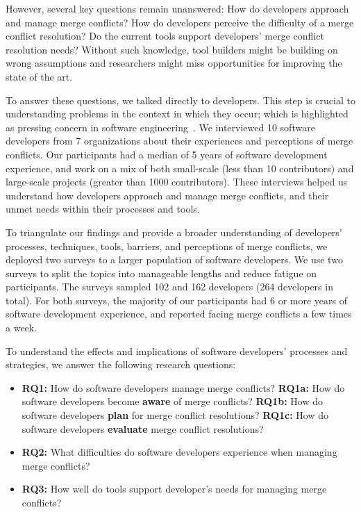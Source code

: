 However, several key questions remain unanswered: 
How do developers approach and manage merge conflicts?
How do developers perceive the difficulty of a merge conflict resolution? 
Do the current tools support developers' merge conflict resolution needs?
Without such knowledge, tool builders might be building on wrong assumptions and researchers might miss opportunities for improving the state of the art.

To answer these questions, we talked directly to developers.
This step is crucial to understanding problems in the context in which they occur; which is highlighted as pressing concern in software engineering~\cite{fritz2010using, sillito2006questions, ko2007information}.
We interviewed 10 software developers from 7 organizations about their experiences and perceptions of merge conflicts. %
Our participants had a median of 5 years of software development experience, and work on a mix of both small-scale (less than 10 contributors) and large-scale projects (greater than 1000 contributors).
These interviews helped us understand how developers approach and manage merge conflicts, and their unmet needs within their processes and tools.

To triangulate our findings and provide a broader understanding of developers' processes, techniques, tools, barriers, and perceptions of merge conflicts, we deployed two surveys to a larger population of software developers.
We use two surveys to split the topics into manageable lengths and reduce fatigue on participants.
The surveys sampled 102 and 162 developers (264 developers in total).
For both surveys, the majority of our participants had 6 or more years of software development experience, and reported facing merge conflicts a few times a week.

To understand the effects and implications of software developers' processes and strategies, we answer the following research questions:

\begin{itemize}[label=$\bullet$]
\item \textbf{RQ1:} How do software developers manage merge conflicts?
\subitem \textbf{RQ1a:} How do software developers become \textbf{aware} of merge conflicts?
\subitem \textbf{RQ1b:} How do software developers \textbf{plan} for merge conflict resolutions?
\subitem \textbf{RQ1c:} How do software developers \textbf{evaluate} merge conflict resolutions?
\item \textbf{RQ2:} What difficulties do software developers experience when managing merge conflicts?
\item \textbf{RQ3:} How well do tools support developer's needs for managing merge conflicts?
\end{itemize}

